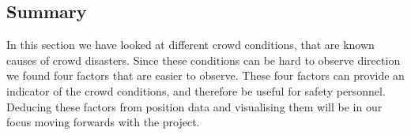 


\subsection{Summary}

In this section we have looked at different crowd conditions, that are known causes of crowd disasters. Since these conditions can be hard to observe direction we found four factors that are easier to observe. These four factors can provide an indicator of the crowd conditions, and therefore be useful for safety personnel. Deducing these factors from position data and visualising them will be in our focus moving forwards with the project.